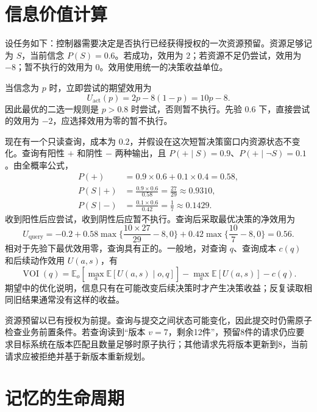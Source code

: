 \documentclass[../textbook.tex]{subfiles}
\begin{document}
\section{信息价值计算}
\optional
\begin{example}
\optional


设任务如下：控制器需要决定是否执行已经获得授权的一次资源预留。资源足够记为 $S$，当前信念 $P(S)=0.6$。若成功，效用为 $2$；若资源不足仍尝试，效用为 $-8$；暂不执行的效用为 $0$。效用使用统一的决策收益单位。

当信念为 $p$ 时，立即尝试的期望效用为
\begin{equation*}
 U_{\mathrm{act}}(p)=2p-8(1-p)=10p-8.
\end{equation*}
因此最优的二选一规则是 $p>0.8$ 时尝试，否则暂不执行。先验 $0.6$ 下，直接尝试的效用为 $-2$，应选择效用为零的暂不执行。

现在有一个只读查询，成本为 $0.2$，并假设在这次短暂决策窗口内资源状态不变化。查询有阳性 $+$ 和阴性 $-$ 两种输出，且 $P(+\mid S)=0.9$、$P(+\mid\neg S)=0.1$。由全概率公式，
\begin{align*}
 P(+)&=0.9\times0.6+0.1\times0.4=0.58,\\
 P(S\mid +)&=\frac{0.9\times0.6}{0.58}=\frac{27}{29}\approx0.9310,\\
 P(S\mid -)&=\frac{0.1\times0.6}{0.42}=\frac17\approx0.1429.
\end{align*}
收到阳性后应尝试，收到阴性后应暂不执行。查询后采取最优决策的净效用为
\begin{equation*}
 U_{\mathrm{query}}=-0.2+0.58\max\{\frac{10\times27}{29}-8,0\}+0.42\max\{\frac{10}{7}-8,0\}=0.56.
\end{equation*}
相对于先验下最优效用零，查询具有正的。一般地，对查询 $q$、查询成本 $c(q)$ 和后续动作效用 $U(a,s)$，有
\begin{equation*}
 \operatorname{VOI}(q)=\mathbb E_o\left[\max_a\mathbb E[U(a,s)\mid o,q]\right]-\max_a\mathbb E[U(a,s)]-c(q).
\end{equation*}
期望中的优化说明，信息只有在可能改变后续决策时才产生决策收益；反复读取相同旧结果通常没有这样的收益。

资源预留以已有授权为前提。查询与提交之间状态可能变化，因此提交时仍需原子检查业务前置条件。若查询读到“版本 $v=7$，剩余12件”，预留8件的请求仍应要求目标系统在版本匹配且数量足够时原子执行；其他请求先将版本更新到8，当前请求应被拒绝并基于新版本重新规划。
\end{example}

\section{记忆的生命周期}
\end{document}
